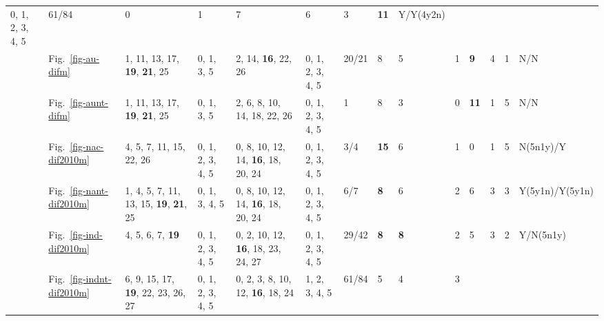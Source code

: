 \begin{table*}
{\begin{tabular}{l|l|l|l|l|l|l|l|l|l|l|l|l|l}
  \multirow{2}{*}{\parbox{1cm}{0, 1, 2, 3, 4, 5}} & 61/84 & 0 & 1 & 7 & 6 & 3 &
  \textbf{11} & Y/Y(4y2n) \\ \\ \cline{2-14}
& Fig.~\ref{fig-au-difm} & \multirow{2}{*}{\parbox{2cm}{1, 11, 13, 17,
  \textbf{19}, \textbf{21}, 25}} & \multirow{2}{*}{\parbox{1cm}{0, 1, 3, 5}} &
  \multirow{2}{*}{\parbox{2.4cm}{2, 14, \textbf{16}, 22, 26}} &
  \multirow{2}{*}{\parbox{1cm}{0, 1, 2, 3, 4, 5}} & 20/21 & 8 & 5 & 1 & \textbf{9} & 4
  & 1 & N/N \\ \\ \cline{2-14}
& Fig.~\ref{fig-aunt-difm} & \multirow{2}{*}{\parbox{2cm}{1, 11, 13, 17,
  \textbf{19}, \textbf{21}, 25}} & \multirow{2}{*}{\parbox{1cm}{0, 1, 3, 5}} &
  \multirow{2}{*}{\parbox{2.4cm}{2, 6, 8, 10, 14, 18, 22, 26}} &
  \multirow{2}{*}{\parbox{1cm}{0, 1, 2, 3, 4, 5}} & 1 & 8 & 3 & 0 & \textbf{11} & 1 & 5 &
  N/N \\ \\ \cline{2-14}
& Fig.~\ref{fig-nac-dif2010m} & \multirow{2}{*}{\parbox{2cm}{4, 5, 7, 11,
  15, 22, 26}} & \multirow{2}{*}{\parbox{1cm}{0, 1, 2, 3, 4, 5}} &
  \multirow{2}{*}{\parbox{2.4cm}{0, 8, 10, 12, 14, \textbf{16}, 18, 20, 24}} &
  \multirow{2}{*}{\parbox{1cm}{0, 1, 2, 3, 4, 5}} & 3/4 & \textbf{15} & 6 & 1 & 0 & 1 &
  5 & N(5n1y)/Y \\ \\ \cline{2-14}
& Fig.~\ref{fig-nant-dif2010m} & \multirow{2}{*}{\parbox{2cm}{1, 4, 5, 7,
  11, 13, 15, \textbf{19}, \textbf{21}, 25}} & \multirow{2}{*}{\parbox{1cm}{0, 1, 3, 4, 5}} &
  \multirow{2}{*}{\parbox{2.4cm}{0, 8, 10, 12, 14, \textbf{16}, 18, 20, 24}} &
  \multirow{2}{*}{\parbox{1cm}{0, 1, 2, 3, 4, 5}} & 6/7 & \textbf{8} & 6 & 2 & 6 &
  3 & 3 & Y(5y1n)/Y(5y1n) \\ \\ \cline{2-14}
& Fig.~\ref{fig-ind-dif2010m} & \multirow{2}{*}{\parbox{2cm}{4, 5, 6, 7,
  \textbf{19}}} & \multirow{2}{*}{\parbox{1cm}{0, 1, 2, 3, 4, 5}} &
  \multirow{2}{*}{\parbox{2.4cm}{0, 2, 10, 12, \textbf{16}, 18, 23, 24, 27}} &
  \multirow{2}{*}{\parbox{1cm}{0, 1, 2, 3, 4, 5}} & 29/42 & \textbf{8} & \textbf{8} & 2 & 5 & 3
  & 2 & Y/N(5n1y) \\ \\ \cline{2-14}
& Fig.~\ref{fig-indnt-dif2010m} & \multirow{2}{*}{\parbox{2cm}{6, 9, 15,
  17, \textbf{19}, 22, 23, 26, 27}} & \multirow{2}{*}{\parbox{1cm}{0, 1, 2, 3, 4, 5}} &
  \multirow{2}{*}{\parbox{2cm}{0, 2, 3, 8, 10, 12, \textbf{16}, 18, 24}} &
  \multirow{2}{*}{\parbox{1cm}{1, 2, 3, 4, 5}} & 61/84 & 5 & 4 & 3 &

\end{tabular}}
\end{table*}
